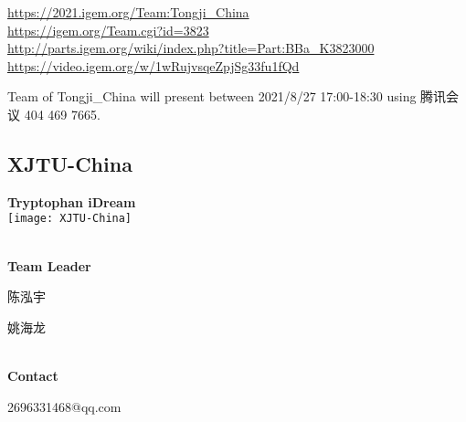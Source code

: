 \url{https://2021.igem.org/Team:Tongji\_China }\\
\url{https://igem.org/Team.cgi?id=3823 }\\
\url{http://parts.igem.org/wiki/index.php?title=Part:BBa_K3823000 }\\
\url{https://video.igem.org/w/1wRujvsqeZpjSg33fu1fQd }\\

\vfill{}









Team of Tongji\_China will present between   2021/8/27 17:00-18:30      using 腾讯会议 404 469 7665.
\newpage


\subsection{\textcolor{Blu}{ XJTU-China } }
\vspace{5mm}
\begin{center}
\large{
  \textbf{ Tryptophan iDream }\\

  \texttt{[image: XJTU-China]}
}
\end{center}
\textbf{\\Team Leader}

  陈泓宇

  姚海龙


\textbf{\\Contact}

  2696331468@qq.com


